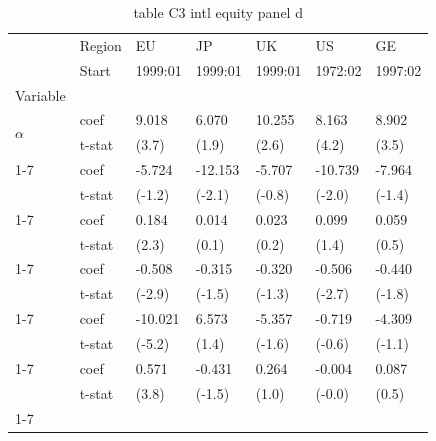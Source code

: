 \begin{table}[htbp]
  \centering
  \caption{table C3 intl equity panel d}
  \label{tab:table_C3_intl_equity_panel_d}
  \begin{tabular}{lllllll}
\toprule
 & Region & EU & JP & UK & US & GE \\
 & Start & 1999:01 & 1999:01 & 1999:01 & 1972:02 & 1997:02 \\
Variable &  &  &  &  &  &  \\
\midrule
\multirow[t]{2}{*}{$\alpha$} & coef & 9.018 & 6.070 & 10.255 & 8.163 & 8.902 \\
 & t-stat & (3.7) & (1.9) & (2.6) & (4.2) & (3.5) \\
\cline{1-7}
\multirow[t]{2}{*}{$I_{B\sigma^2}$} & coef & -5.724 & -12.153 & -5.707 & -10.739 & -7.964 \\
 & t-stat & (-1.2) & (-2.1) & (-0.8) & (-2.0) & (-1.4) \\
\cline{1-7}
\multirow[t]{2}{*}{$R^e_m$} & coef & 0.184 & 0.014 & 0.023 & 0.099 & 0.059 \\
 & t-stat & (2.3) & (0.1) & (0.2) & (1.4) & (0.5) \\
\cline{1-7}
\multirow[t]{2}{*}{$I_B R^e_m$} & coef & -0.508 & -0.315 & -0.320 & -0.506 & -0.440 \\
 & t-stat & (-2.9) & (-1.5) & (-1.3) & (-2.7) & (-1.8) \\
\cline{1-7}
\multirow[t]{2}{*}{$\hat{\sigma}^2_m R^e_m$} & coef & -10.021 & 6.573 & -5.357 & -0.719 & -4.309 \\
 & t-stat & (-5.2) & (1.4) & (-1.6) & (-0.6) & (-1.1) \\
\cline{1-7}
\multirow[t]{2}{*}{$I_{B\sigma^2} R^e_m$} & coef & 0.571 & -0.431 & 0.264 & -0.004 & 0.087 \\
 & t-stat & (3.8) & (-1.5) & (1.0) & (-0.0) & (0.5) \\
\cline{1-7}
\bottomrule
\end{tabular}

\end{table}
